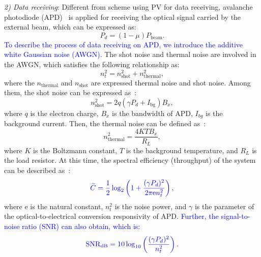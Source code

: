 \documentclass{IEEEtran}
\begin{document}
\emph{2) Data receiving}:
Different from scheme using PV for data receiving, avalanche photodiode (APD)~\cite{aziz2014simulation,campbell2007APD} is applied for receiving the optical signal carried by the external beam, which can be expressed as: %
\begin{equation}\label{d1}
P_d=(1-\mu) P_\mathrm{beam}.
\end{equation}
\textcolor{blue}{To describe the process of data receiving on APD, we introduce the additive white Gaussian noise (AWGN).}
The shot noise and thermal noise are involved in the AWGN, which satisfies the following relationship as:
\begin{equation}
    n_t^2=n^2_\mathrm{shot}+n^2_\mathrm{thermal},
\end{equation}
where the $n_\mathrm{thermal}$ and $n_\mathrm{shot}$ are expressed thermal noise and shot noise. 
Among them, the shot noise can be expressed as~\cite{46}: 
\begin{equation}\label{d5}
    n^2_\mathrm{shot}=2q(\gamma P_d+I_\mathrm{bg})B_x,
\end{equation}
where $q$ is the electron charge, $B_x$ is the bandwidth of APD, $I_{bg}$ is the background current. Then, the thermal noise can be defined as~\cite{46}:
\begin{equation}\label{d6}
    n^2_\mathrm{thermal}=\frac{4KTB_x}{R_L},
\end{equation}
where $K$ is the Boltzmann constant, $T$ is the background temperature, and $R_L$ is the load resistor. 
At this time, the spectral efficiency (throughput) of the system can be described as~\cite{lapidoth2009capacity}:
\begin{equation}\label{d2}
\textcolor{blue}{
    \widetilde{C}=\frac{1}{2}\log_2\left(1+\frac{(\gamma P_d)^2}{2\pi \mathrm{e}n^2_t}\right),}
\end{equation}
where $\mathrm{e}$ is the natural constant,  $n_t^2$ is the noise power, and $\gamma$ is the parameter of the optical-to-electrical conversion responsivity of APD. \textcolor{blue}{Further, the signal-to-noise ratio (SNR) can also obtain, which is: }
\begin{equation}\label{d3}
\textcolor{blue}{\mathrm{SNR}_{\mathrm{dB}}=10 \log _{10}\left(\frac{(\gamma P_d)^2}{n_t^2}\right).}
\end{equation}
\end{document}
